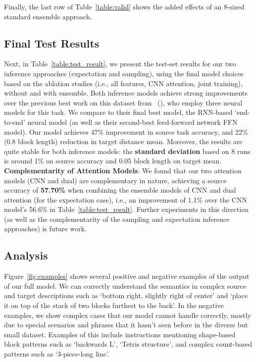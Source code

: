 \documentclass[letterpaper]{article} %
\newcommand{\newcite}[1]{\citeauthor{#1} (\citeyear{#1})}
\begin{document}
Finally, the last row of Table~\ref{table:valid} shows the added effects of an 8-sized standard ensemble approach.


\subsection{Final Test Results}
\label{sec:finaltest}
Next, in Table~\ref{table:test_result}, we present the test-set results for our two inference approaches (expectation and sampling), using the final model choices based on the ablation studies (i.e., all features, CNN attention, joint training), without and with ensemble.
Both inference models achieve strong improvements over the previous best work on this dataset from~\newcite{bisk2016natural}, who employ three neural models for this task. We compare to their final best model, the RNN-based `end-to-end' neural model (as well as their second-best feed-forward network FFN model).
Our model achieves 47\% improvement in source task accuracy, and 22\% (0.8 block length) reduction in target distance mean.
Moreover, the results are quite stable for both inference models: the \textbf{standard deviation} based on 8 runs is around 1\% on source accuracy and 0.05 block length on target mean.  \textbf{Complementarity of Attention Models}:
We found that our two attention models (CNN and dual) are complementary in nature, achieving a source accuracy of \textbf{57.70\%} when combining the ensemble models of CNN and dual attention (for the expectation case), i.e., an improvement of 1.1\% over the CNN model's 56.6\% in Table~\ref{table:test_result}.
Further experiments in this direction (as well as the complementarity of the sampling and expectation inference approaches) is future work.



\subsection{Analysis}
Figure~\ref{fig:examples} shows several positive and negative examples of the output of our full model. We can correctly understand the semantics in complex source and target descriptions such as `bottom right, slightly right of center' and `place it on top of the stack of two blocks furthest to the back'. In the negative examples, we show complex cases that our model cannot handle correctly, mostly due to special scenarios and phrases that it hasn't seen before in the diverse but small dataset. Examples of this include instructions mentioning shape-based block patterns such as `backwards L', `Tetris structure', and complex count-based patterns such as `3-piece-long line'.
\end{document}

